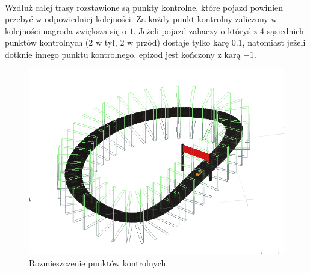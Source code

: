 \vspace{4cm}\\
Wzdłuż całej trasy rozstawione są punkty kontrolne, które pojazd powinien przebyć w odpowiedniej kolejności. Za każdy punkt kontrolny zaliczony w kolejności nagroda zwiększa się o $1$. Jeżeli pojazd zahaczy o któryś z 4 sąsiednich punktów kontrolnych (2 w tył, 2 w przód) dostaje tylko karę $0.1$, natomiast jeżeli dotknie innego punktu kontrolnego, epizod jest kończony z karą $-1$.
\begin{figure}[H]
    \centering
    \includegraphics[width=.5\textwidth]{figures/checkpoints}
    \caption{Rozmieszczenie punktów kontrolnych}
    \label{fig}
\end{figure}

\phantom{.}\\
\vspace{1cm}\\

